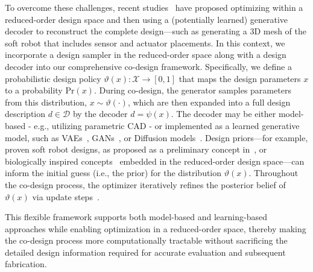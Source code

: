 To overcome these challenges, recent studies~\citep{song2024morphvae, wang2024diffusebot, navez2024contributions} have proposed optimizing within a reduced-order design space and then using a (potentially learned) generative decoder to reconstruct the complete design—such as generating a 3D mesh of the soft robot that includes sensor and actuator placements. In this context, we incorporate a design sampler in the reduced-order space along with a design decoder into our comprehensive co-design framework. Specifically, we define a probabilistic design policy $\vartheta(x): \mathcal{X} \to [0,1]$ that maps the design parameters $x$ to a probability $\mathrm{Pr}(x)$. During co-design, the generator samples parameters from this distribution, $x \sim \vartheta(\cdot)$, which are then expanded into a full design description $d \in \mathcal{D}$ by the decoder $d = \psi(x)$. The decoder may be either model-based - e.g., utilizing parametric \gls{CAD} - or implemented as a learned generative model, such as \glspl{VAE}~\citep{song2024morphvae, navez2024contributions}, \glspl{GAN}~\citep{hu2022modular}, or Diffusion models~\citep{wang2024diffusebot}. 
Design priors—for example, proven soft robot designs, as proposed as a preliminary concept in~\citep{navez2024contributions}, or biologically inspired concepts~\citep{mazzolai2020vision, chen2020design, laschi2024bioinspiration} embedded in the reduced-order design space—can inform the initial guess (i.e., the prior) for the distribution $\vartheta(x)$. Throughout the co-design process, the optimizer iteratively refines the posterior belief of $\vartheta(x)$ via update steps~\citep{song2024morphvae, sutton1998reinforcement}.

This flexible framework supports both model-based and learning-based approaches while enabling optimization in a reduced-order space, thereby making the co-design process more computationally tractable without sacrificing the detailed design information required for accurate evaluation and subsequent fabrication.

